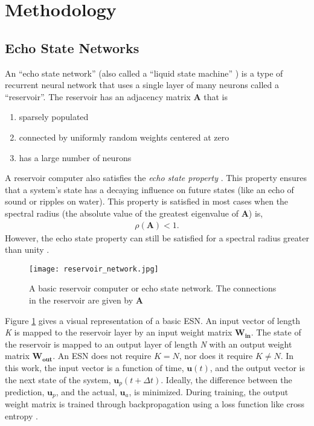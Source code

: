 \section{Methodology}

\subsection{Echo State Networks}
An ``echo state network'' (also
called a ``liquid state machine'' \cite{lukosevicius_practical_2012}) is a type
of recurrent neural network that uses a single layer of many neurons called a
``reservoir''. The reservoir has an adjacency matrix $\bm{A}$ that is
\begin{enumerate}
	\item sparsely populated
	\item connected by uniformly random weights centered at zero
	\item has a large number of neurons
\end{enumerate}
A reservoir computer also satisfies the \textit{echo state property}
\cite{pathak_model-free_2018, lukosevicius_reservoir_2009}. This
property ensures that a system's state has a decaying influence on future states
(like an echo of sound or ripples on water). This property is satisfied in most
cases when the spectral radius (the absolute value of the greatest eigenvalue of
$\bm{A}$)\cite{lukosevicius_reservoir_2009} is,
\begin{align}
	\rho(\bm{A}) < 1.
\end{align}
However, the echo state property can still be satisfied for a spectral radius
greater than unity \cite{lukosevicius_practical_2012}.

\begin{figure}[H]
	\texttt{[image: reservoir\_network.jpg]}
	\caption{A basic reservoir computer or echo state network. The connections in
	the reservoir are given by $\bm{A}$}
	\label{fig:RCmodel}
\end{figure}

Figure \ref{fig:RCmodel} gives a visual representation of a basic
\acrshort{ESN}. An
input vector of length \textit{K} is mapped to the reservoir layer by an input
weight matrix $\bm{W_{in}}$. The state of the reservoir is mapped to an output
layer of length \textit{N} with an output weight matrix $\bm{W_{out}}$. An ESN
does not require $K=N$, nor does it require $K \neq N$. In this
work, the input vector is a function of time, $\bm{u}(t)$, and the output
vector is the next state of the system, $\bm{u}_p(t+\Delta t)$. Ideally, the
difference between the prediction, $\bm{u}_p$, and the actual, $\bm{u}_a$, is
minimized. During training, the output weight matrix is trained through
backpropagation using a loss function like cross entropy
\cite{pathak_model-free_2018, vlachas_backpropagation_2020}.

